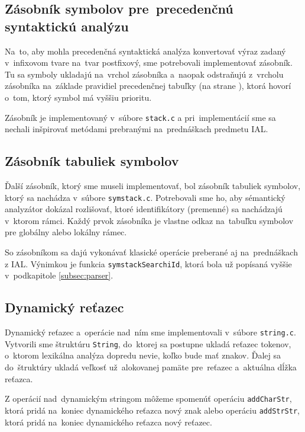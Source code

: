 \documentclass[a4paper, 11pt]{article}
\begin{document}
\subsection{Zásobník symbolov pre~precedenčnú syntaktickú analýzu}
\label{subsec:stack}
    Na~to, aby mohla precedenčná syntaktická analýza konvertovať výraz zadaný v~infixovom tvare na~tvar postfixový, sme potrebovali implementovať zásobník. Tu sa symboly ukladajú na~vrchol zásobníka a~naopak odstraňujú z~vrcholu zásobníka na~základe pravidiel precedenčnej tabuľky (na strane \pageref{figure:preced_tab}), ktorá hovorí o~tom,
    ktorý symbol má vyššiu prioritu.
    
    Zásobník je implementovaný v~súbore \texttt{stack.c} a pri~implementácií sme sa nechali inšpirovať metódami
    prebranými na~prednáškach predmetu IAL.
    

\subsection{Zásobník tabuliek symbolov}
\label{subsec:symstack}
    Ďalší zásobník, ktorý sme museli implementovať, bol zásobník tabuliek symbolov, ktorý sa nachádza v~súbore \texttt{symstack.c}. Potrebovali sme ho, aby sémantický analyzátor dokázal rozlišovať, ktoré identifikátory
    (premenné) sa nachádzajú v~ktorom rámci. Každý prvok zásobníka je vlastne odkaz na~tabuľku symbolov pre globálny alebo lokálny rámec.
    
    So zásobníkom sa dajú vykonávať klasické operácie preberané aj na~prednáškach z IAL. Výnimkou je
    funkcia \texttt{symstackSearchiId}, ktorá bola už popísaná vyššie v~podkapitole \ref{subsec:parser}.

\subsection{Dynamický reťazec}

    Dynamický reťazec a~operácie nad~ním sme implementovali v~súbore \texttt{string.c}. Vytvorili sme štruktúru \texttt{String}, do~ktorej sa postupne ukladá reťazec tokenov, o~ktorom lexikálna analýza dopredu nevie, koľko bude mať znakov. Ďalej sa do~štruktúry ukladá veľkosť už~alokovanej pamäte pre~reťazec a~aktuálna dĺžka reťazca.

    Z operácií nad~dynamickým stringom môžeme spomenúť operáciu \texttt{addCharStr}, ktorá pridá na~koniec dynamického reťazca nový znak alebo operáciu \texttt{addStrStr}, ktorá pridá na~koniec dynamického reťazca nový reťazec.
\end{document}
